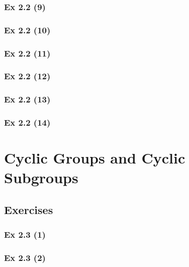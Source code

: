 \subsubsection{Ex 2.2 (9)}\label{sec:Ex_2.2.9}

\subsubsection{Ex 2.2 (10)}\label{sec:Ex_2.2.10}

\newpage		%

\subsubsection{Ex 2.2 (11)}\label{sec:Ex_2.2.11}

\subsubsection{Ex 2.2 (12)}\label{sec:Ex_2.2.12}

\subsubsection{Ex 2.2 (13)}\label{sec:Ex_2.2.13}

\subsubsection{Ex 2.2 (14)}\label{sec:Ex_2.2.14}

\newpage		%

\section{Cyclic Groups and Cyclic Subgroups}\label{sec:2.3}
\subsection*{Exercises}\label{sec:2.3_Exercises}

\subsubsection{Ex 2.3 (1)}\label{sec:Ex_2.3.1}

\subsubsection{Ex 2.3 (2)}\label{sec:Ex_2.3.2}

